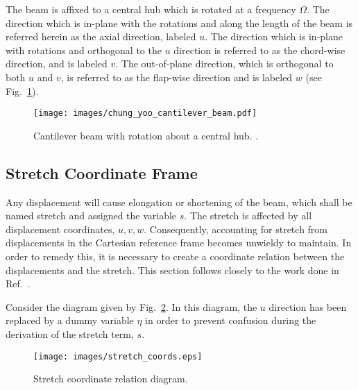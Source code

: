 The beam is affixed to a central hub which is rotated at a frequency $\Omega$. The direction which is in-plane with the rotations and along the length of the beam is referred herein as the axial direction, labeled $u$. The direction which is in-plane with rotations and orthogonal to the $u$ direction is referred to as the chord-wise direction, and is labeled $v$. The out-of-plane direction, which is orthogonal to both $u$ and $v$, is referred to as the flap-wise direction and is labeled $w$ (see Fig.~\ref{fig:canti_diag}).

\begin{figure}[ht!]
\label{fig:canti_diag}
\caption[Cantilever beam with rotation about a central hub.]{Cantilever beam with rotation about a central hub. \protect{}.}
\centering
\texttt{[image: images/chung\_yoo\_cantilever\_beam.pdf]}
\end{figure}

\subsection{Stretch Coordinate Frame}
\label{subsec:stretch}
Any displacement will cause elongation or shortening of the beam, which shall be named stretch and assigned the variable $s$. The stretch is affected by all displacement coordinates, $u,v,w$. Consequently, accounting for stretch from displacements in the Cartesian reference frame becomes unwieldy to maintain. In order to remedy this, it is necessary to create a coordinate relation between the displacements and the stretch. This section follows closely to the work done in Ref.~\cite{lima2012thesis}.

Consider the diagram given by Fig.~\ref{fig:stretch_coord_lima}. In this diagram, the $u$ direction has been replaced by a dummy variable $\eta$ in order to prevent confusion during the derivation of the stretch term, $s$. 

\begin{figure}[ht!]
\caption[Stretch coordinate relation diagram.]{Stretch coordinate relation diagram. \protect{}}
\label{fig:stretch_coord_lima}
\centering
\texttt{[image: images/stretch\_coords.eps]}
\end{figure}

